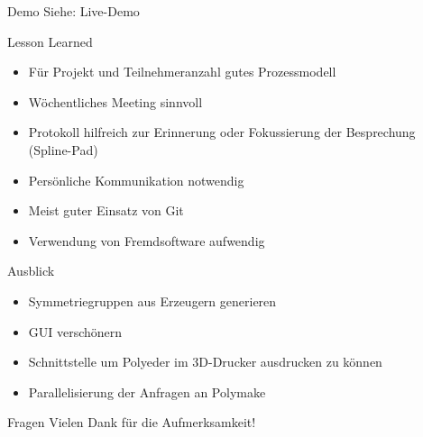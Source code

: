\documentclass[ucs,11pt]{beamer}
\begin{document}
\begin{frame}{Demo}
\huge{Siehe: Live-Demo}
\end{frame}

\begin{frame}{Lesson Learned}
	\begin{itemize}
		\item Für Projekt und Teilnehmeranzahl gutes Prozessmodell \pause
		\item Wöchentliches Meeting sinnvoll \pause
		\item Protokoll hilfreich zur Erinnerung oder Fokussierung der Besprechung (Spline-Pad) \pause
		\item Persönliche Kommunikation notwendig \pause
		\item Meist guter Einsatz von Git \pause
		\item Verwendung von Fremdsoftware aufwendig \pause
	\end{itemize}
\end{frame}

\begin{frame}{Ausblick}
\begin{itemize}
	\item Symmetriegruppen aus Erzeugern generieren
	\item GUI verschönern
	\item Schnittstelle um Polyeder im 3D-Drucker ausdrucken zu können
	\item Parallelisierung der Anfragen an Polymake
\end{itemize}
\end{frame}


\begin{frame}[t]{Fragen}
\vspace{1cm}
\huge{Vielen Dank für die Aufmerksamkeit!} \\
\vspace{1cm}
\end{frame}
\end{document}

